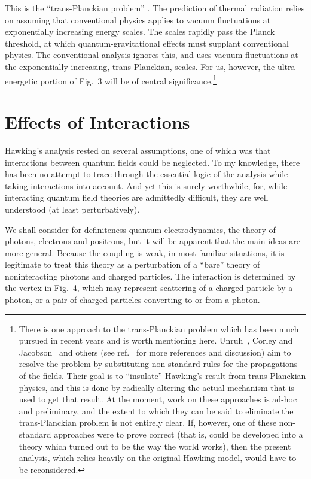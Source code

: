\documentclass[11pt]{article}
\begin{document}
This is the ``trans-Planckian problem'' \cite{Gibbons:1977,Helfer:2003}.   The
prediction of thermal radiation relies on assuming that conventional physics
applies to vacuum fluctuations at exponentially increasing energy scales.  The
scales rapidly pass the Planck threshold, at which quantum-gravitational
effects must supplant conventional physics. The conventional  analysis
\cite{Hawking:1974,Hawking:1975} ignores this, and uses vacuum fluctuations at
the exponentially increasing, trans-Planckian, scales. For us, however, the
ultra-energetic portion of Fig.~3 will be of central
significance.\footnote{There is one approach to the trans-Planckian problem 
which has been much pursued in recent years and is worth mentioning here.  
Unruh~\cite{Unruh:1995}, Corley and Jacobson~\cite{CJ:1996} and others (see 
ref.~\cite{Helfer:2003} for more references and discussion) aim to resolve the
problem by substituting non-standard rules for the propagations of the fields. 
Their goal is to ``insulate'' Hawking's  result from trans-Planckian physics,
and this is done by radically altering the actual mechanism that is used to get
that result. At the moment, work on these approaches is ad-hoc and preliminary,
and the extent to which they can be said to eliminate the trans-Planckian
problem is not entirely clear.  If, however, one of these non-standard 
approaches were to prove correct (that is, could be developed into a  theory
which turned out to be the way the world works), then the present  analysis,
which relies heavily on the original Hawking model, would have to be
reconsidered.}

\section{Effects of Interactions}
\label{EI}

Hawking's analysis rested on several assumptions,  one of which was
that interactions between quantum fields could be neglected.  To my knowledge,
there has been no attempt to trace through the essential logic of the analysis
while taking interactions into account. And yet this is surely worthwhile, for,
while interacting quantum field theories are admittedly difficult, they are
well understood (at least perturbatively).  

We shall consider for definiteness quantum electrodynamics, the theory of
photons, electrons and positrons, but it will be apparent that the main ideas
are more general.  Because the coupling is weak, in most familiar situations,
it is legitimate to treat this theory as a perturbation of a ``bare'' theory of
noninteracting photons and charged particles.  The interaction is determined by
the vertex in Fig.~4, which may represent scattering of a charged particle by a
photon, or a pair of charged particles converting to or from a photon.
\end{document}
